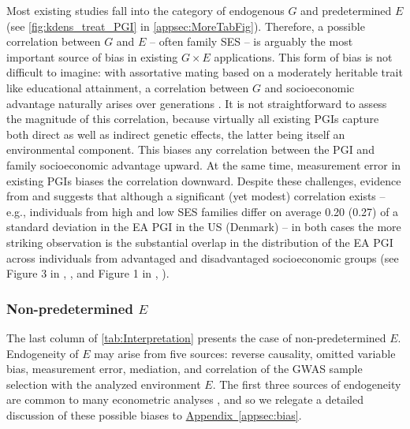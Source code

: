 \documentclass[12pt,a4paper]{article}
\begin{document}
\begin{bibunit}
Most existing studies fall into the category of endogenous $G$ and predetermined $E$ (see \autoref{fig:kdens_treat_PGI} in \autoref{appsec:MoreTabFig}). Therefore, a possible correlation between $G$ and $E$ -- often family SES -- is arguably the most important source of bias in existing $G \times E$ applications. This form of bias is not difficult to imagine: with assortative mating based on a moderately heritable trait like educational attainment, a correlation between $G$ and socioeconomic advantage naturally arises over generations \citep{Adbellaoui2022trading}. It is not straightforward to assess the magnitude of this correlation, because virtually all existing PGIs capture both direct as well as indirect genetic effects, the latter being itself an environmental component. This biases any correlation between the PGI and family socioeconomic advantage upward. At the same time, measurement error in existing PGIs biases the correlation downward. Despite these challenges, evidence from \citet{papageorge2020genes} and \citet{ronda2022family} suggests that although a significant (yet modest) correlation exists -- e.g., individuals from high and low SES families differ on average 0.20 (0.27) of a standard deviation in the EA PGI in the US (Denmark) -- in both cases the more striking observation is the substantial overlap in the distribution of the EA PGI across individuals from advantaged and disadvantaged socioeconomic groups (see Figure 3 in \citeauthor{papageorge2020genes}, \citeyear{papageorge2020genes}, and Figure 1 in \citeauthor{ronda2022family}, \citeyear{ronda2022family}). 

\subsubsection{Non-predetermined \texorpdfstring{$E$}{}}
\label{subsec:endogenousE}
The last column of \autoref{tab:Interpretation} presents the case of non-predetermined $E$. Endogeneity of $E$ may arise from five sources: reverse causality, omitted variable bias, measurement error, mediation, and correlation of the GWAS sample selection with the analyzed environment $E$. The first three sources of endogeneity are common to many econometric analyses \citep[see, among others,][]{Wooldridge2002,angrist2008mostly,Cunningham2021mixtape}, and so we relegate a detailed discussion of these possible biases to \hyperref[appsec:bias]{Appendix~\ref*{appsec:bias}}.


\end{bibunit}
\end{document}
